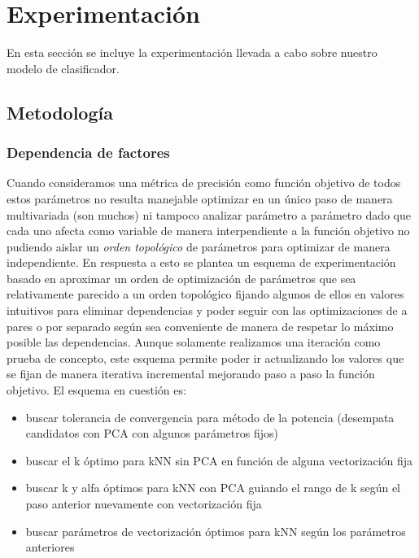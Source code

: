 \section{Experimentación}%
\label{sec:experimentacion}

En esta sección se incluye la experimentación llevada a cabo sobre nuestro
modelo de clasificador.

\subsection{Metodología}%
\label{sub:metodologia}
\subsubsection{Dependencia de factores}

Cuando consideramos una métrica de precisión como función objetivo de todos estos parámetros
no resulta manejable optimizar en un único paso de manera multivariada (son muchos)
ni tampoco analizar parámetro a parámetro dado que cada uno afecta como variable de manera
interpendiente a la función objetivo no pudiendo aislar un \textit{orden topológico}
de parámetros para optimizar de manera independiente.
En respuesta a esto se plantea un esquema de experimentación basado en aproximar
un orden de optimización de parámetros que sea relativamente parecido a un orden
topológico fijando algunos de ellos en valores intuitivos para eliminar dependencias
y poder seguir con las optimizaciones de a pares o por separado según sea conveniente
de manera de respetar lo máximo posible las dependencias.
Aunque solamente realizamos una iteración como prueba de concepto, este esquema
permite poder ir actualizando los valores que se fijan de manera iterativa incremental
mejorando paso a paso la función objetivo. El esquema en cuestión es:
\begin{itemize}
    \item buscar tolerancia de convergencia para método de la potencia (desempata candidatos con PCA con algunos parámetros fijos)
    \item buscar el k óptimo para kNN sin PCA en función de alguna vectorización fija
    \item buscar k y alfa óptimos para kNN con  PCA guiando el rango de k según el paso anterior nuevamente con vectorización fija
    \item buscar parámetros de vectorización óptimos para kNN según los parámetros anteriores
\end{itemize}


